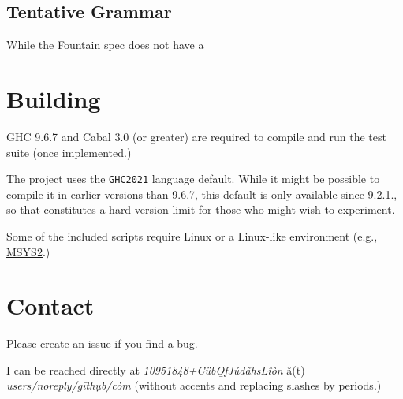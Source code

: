\documentclass[11pt]{article}
\newcommand{\link}[2]{\underline{\color{darkblue}\href{#1}{#2}}}
\begin{document}
  \subsection*{Tentative Grammar}
  While the \textrm{Fountain} spec does not have a
  

\section*{Building}
\textrm{GHC} 9.6.7 and \textrm{Cabal} 3.0 (or greater) are
required to compile and run the test suite (once implemented.)

The project uses the \texttt{GHC2021} language default. While
it might be possible to compile it in earlier versions than
9.6.7, this default is only available since 9.2.1., so that
constitutes a hard version limit for those who might wish to
experiment.

Some of the included scripts require Linux or a Linux-like
environment (e.g.,
\link{https://www.msys2.org/}{\textrm{MSYS2}}.)

\section*{Contact}
Please
\link{https://github.com/CubOfJudahsLion/fountain-parser/issues}{create an issue}
if you find a bug.

I can be reached directly at
\emph{\textrm{10951848+C\"{u}b\b{O}fJ\'{u}d\~{a}hsL\^{i}\`{o}n}}
\u{a}(t) \emph{\textrm{users/noreply/g\={i}th\d{u}b/c\.{o}m}}
(without accents and replacing slashes by periods.)
\end{document}
